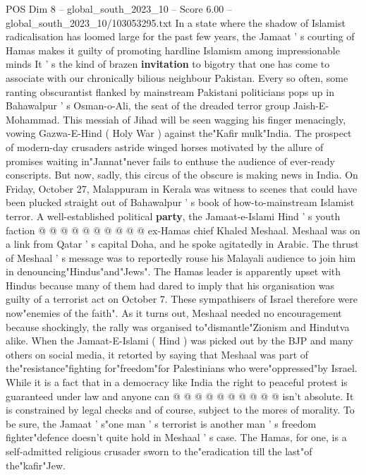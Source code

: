 \begin{textsample}{POS Dim 8 – global\_south\_2023\_10 – Score 6.00 – global\_south\_2023\_10/103053295.txt}  \label{ex:f8_pos_360}
In a state where the shadow of Islamist radicalisation has loomed large for the past few years, the Jamaat ' s courting of Hamas makes it guilty of promoting hardline Islamism among impressionable minds It ' s the kind of brazen \textbf{invitation} to bigotry that one has come to associate with our chronically bilious neighbour Pakistan.
Every so often, some ranting obscurantist flanked by mainstream Pakistani politicians pops up in Bahawalpur ' s Osman-o-Ali, the seat of the dreaded terror group Jaish-E-Mohammad.
This messiah of Jihad will be seen wagging his finger menacingly, vowing Gazwa-E-Hind ( Holy War ) against the"Kafir mulk"India.
The prospect of modern-day crusaders astride winged horses motivated by the allure of promises waiting in"Jannat"never fails to enthuse the audience of ever-ready conscripts.
But now, sadly, this circus of the obscure is making news in India.
On Friday, October 27, Malappuram in Kerala was witness to scenes that could have been plucked straight out of Bahawalpur ' s book of how-to-mainstream Islamist terror.
A well-established political \textbf{party}, the Jamaat-e-Islami Hind ' s youth faction @ @ @ @ @ @ @ @ @ @ ex-Hamas chief Khaled Meshaal.
Meshaal was on a link from Qatar ' s capital Doha, and he spoke agitatedly in Arabic.
The thrust of Meshaal ' s message was to reportedly rouse his Malayali audience to join him in denouncing"Hindus"and"Jews".
The Hamas leader is apparently upset with Hindus because many of them had dared to imply that his organisation was guilty of a terrorist act on October 7.
These sympathisers of Israel therefore were now"enemies of the faith".
As it turns out, Meshaal needed no encouragement because shockingly, the rally was organised to"dismantle"Zionism and Hindutva alike.
When the Jamaat-E-Islami ( Hind ) was picked out by the BJP and many others on social media, it retorted by saying that Meshaal was part of the"resistance"fighting for"freedom"for Palestinians who were"oppressed"by Israel.
While it is a fact that in a democracy like India the right to peaceful protest is guaranteed under law and anyone can @ @ @ @ @ @ @ @ @ @ isn't absolute.
It is constrained by legal checks and of course, subject to the mores of morality.
To be sure, the Jamaat ' s"one man ' s terrorist is another man ' s freedom fighter"defence doesn't quite hold in Meshaal ' s case.
The Hamas, for one, is a self-admitted religious crusader sworn to the"eradication till the last"of the"kafir"Jew.

\end{textsample}
